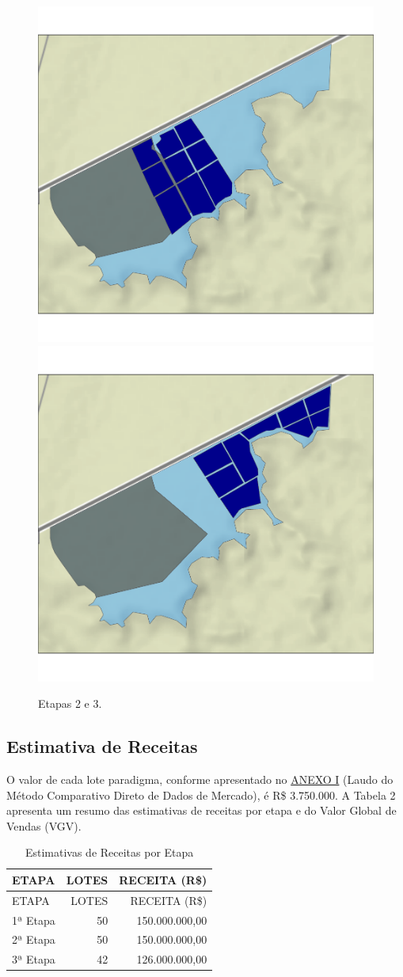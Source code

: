 \documentclass[
  10pt,
  a4paper]{article}
\begin{document}
\begin{figure}[H]

{\centering \includegraphics[width=0.49\linewidth]{images/Etapas2-3-1} \includegraphics[width=0.49\linewidth]{images/Etapas2-3-2} 

}

\caption{Etapas 2 e 3.}\label{fig:Etapas2-3}
\end{figure}

\subsection{Estimativa de Receitas}\label{estimativa-de-receitas}

O valor de cada lote paradigma, conforme apresentado no
\hyperref[anexo-i]{ANEXO I} (Laudo do Método Comparativo Direto de Dados
de Mercado), é R\$ 3.750.000. A Tabela 2 apresenta um resumo das
estimativas de receitas por etapa e do Valor Global de Vendas (VGV).

\begin{longtable}[]{@{}lrr@{}}
\caption{Estimativas de Receitas por Etapa}\tabularnewline
\toprule\noalign{}
ETAPA & LOTES & RECEITA (R\$) \\
\midrule\noalign{}
\endfirsthead
\toprule\noalign{}
ETAPA & LOTES & RECEITA (R\$) \\
\midrule\noalign{}
\endhead
\bottomrule\noalign{}
\endlastfoot
1ª Etapa & 50 & 150.000.000,00 \\
2ª Etapa & 50 & 150.000.000,00 \\
3ª Etapa & 42 & 126.000.000,00 \\
\end{longtable}
\end{document}
